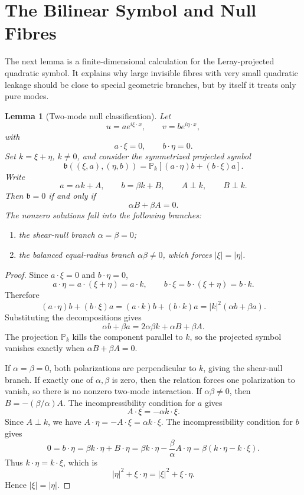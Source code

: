 \documentclass[11pt]{article}
\newtheorem{lemma}[theorem]{Lemma}
\begin{document}
\section{The Bilinear Symbol and Null Fibres}

The next lemma is a finite-dimensional calculation for the Leray-projected quadratic symbol. It explains why large invisible fibres with very small quadratic leakage should be close to special geometric branches, but by itself it treats only pure modes.

\begin{lemma}[Two-mode null classification]
Let
\[
u=a e^{i\xi\cdot x},
\qquad
v=b e^{i\eta\cdot x},
\]
with
\[
a\cdot\xi=0,
\qquad
b\cdot\eta=0.
\]
Set \(k=\xi+\eta\), \(k\ne0\), and consider the symmetrized projected symbol
\[
\mathfrak b((\xi,a),(\eta,b))
=
\mathbb P_k\left[(a\cdot\eta)b+(b\cdot\xi)a\right].
\]
Write
\[
a=\alpha k+A,
\qquad
b=\beta k+B,
\qquad
A\perp k,
\qquad
B\perp k.
\]
Then \(\mathfrak b=0\) if and only if
\[
\alpha B+\beta A=0.
\]
The nonzero solutions fall into the following branches:
\begin{enumerate}[label=(\roman*)]
\item the shear-null branch \(\alpha=\beta=0\);
\item the balanced equal-radius branch \(\alpha\beta\ne0\), which forces \(|\xi|=|\eta|\).
\end{enumerate}
\end{lemma}

\begin{proof}
Since \(a\cdot\xi=0\) and \(b\cdot\eta=0\),
\[
a\cdot\eta=a\cdot(\xi+\eta)=a\cdot k,
\qquad
b\cdot\xi=b\cdot(\xi+\eta)=b\cdot k.
\]
Therefore
\[
(a\cdot\eta)b+(b\cdot\xi)a
=
(a\cdot k)b+(b\cdot k)a
=
|k|^2(\alpha b+\beta a).
\]
Substituting the decompositions gives
\[
\alpha b+\beta a
=
2\alpha\beta k+\alpha B+\beta A.
\]
The projection \(\mathbb P_k\) kills the component parallel to \(k\), so the projected symbol vanishes exactly when \(\alpha B+\beta A=0\).

If \(\alpha=\beta=0\), both polarizations are perpendicular to \(k\), giving the shear-null branch. If exactly one of \(\alpha,\beta\) is zero, then the relation forces one polarization to vanish, so there is no nonzero two-mode interaction. If \(\alpha\beta\ne0\), then \(B=-(\beta/\alpha)A\). The incompressibility condition for \(a\) gives
\[
A\cdot\xi=-\alpha k\cdot\xi.
\]
Since \(A\perp k\), we have \(A\cdot\eta=-A\cdot\xi=\alpha k\cdot\xi\). The incompressibility condition for \(b\) gives
\[
0=b\cdot\eta=\beta k\cdot\eta+B\cdot\eta
=
\beta k\cdot\eta-\frac{\beta}{\alpha}A\cdot\eta
=
\beta(k\cdot\eta-k\cdot\xi).
\]
Thus \(k\cdot\eta=k\cdot\xi\), which is
\[
|\eta|^2+\xi\cdot\eta=|\xi|^2+\xi\cdot\eta.
\]
Hence \(|\xi|=|\eta|\).
\end{proof}
\end{document}
